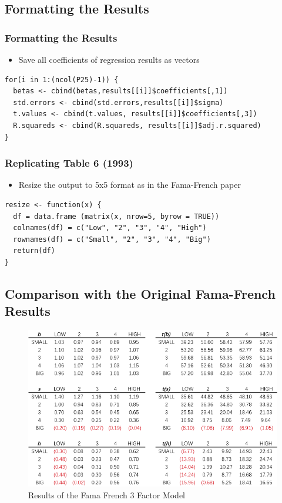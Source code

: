 \documentclass{beamer}
\begin{document}
\subsection{Formatting the Results}
\begin{frame}[fragile]
\frametitle{Formatting the Results}
\begin{itemize}
\item Save all coefficients of regression results as vectors
\end{itemize}
\begin{lstlisting}
for(i in 1:(ncol(P25)-1)) {
  betas <- cbind(betas,results[[i]]$coefficients[,1])
  std.errors <- cbind(std.errors,results[[i]]$sigma)
  t.values <- cbind(t.values, results[[i]]$coefficients[,3])
  R.squareds <- cbind(R.squareds, results[[i]]$adj.r.squared)
}

\end{lstlisting}
\end{frame}
\begin{frame}[fragile]
\frametitle{Replicating Table 6 (1993)}
\begin{itemize}
\item Resize the output to 5x5 format as in the Fama-French paper
\end{itemize}
\begin{lstlisting}
resize <- function(x) {
  df = data.frame (matrix(x, nrow=5, byrow = TRUE))
  colnames(df) = c("Low", "2", "3", "4", "High")
  rownames(df) = c("Small", "2", "3", "4", "Big")
  return(df)
}

\end{lstlisting}
\end{frame}

\subsection{Comparison with the Original Fama-French Results}
\begin{frame}
\begin{figure}
\centering
\includegraphics[scale=.8]{FF3results.png}
\caption{Results of the Fama French 3 Factor Model}
\end{figure}
\end{frame}
\end{document}
